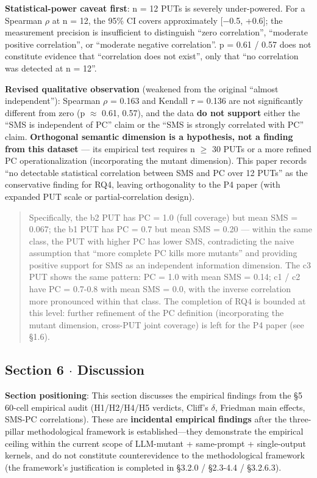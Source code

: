 \documentclass[review,12pt,authoryear]{elsarticle}
\begin{document}
\textbf{Statistical-power caveat first}: n = 12 PUTs is severely
under-powered. For a Spearman $\rho$ at n = 12, the 95\% CI covers
approximately {[}−0.5, +0.6{]}; the measurement precision is
insufficient to distinguish ``zero correlation'', ``moderate positive
correlation'', or ``moderate negative correlation''. p = 0.61 / 0.57
does not constitute evidence that ``correlation does not exist'', only
that ``no correlation was detected at n = 12''.

\textbf{Revised qualitative observation} (weakened from the original
``almost independent''): Spearman $\rho$ = 0.163 and Kendall $\tau$ = 0.136 are
not significantly different from zero (p $\approx$ 0.61, 0.57), and the data
\textbf{do not support} either the ``SMS is independent of PC'' claim or
the ``SMS is strongly correlated with PC'' claim. \textbf{Orthogonal
semantic dimension is a hypothesis, not a finding from this dataset} ---
its empirical test requires n $\geq$ 30 PUTs or a more refined PC
operationalization (incorporating the mutant dimension). This paper
records ``no detectable statistical correlation between SMS and PC over
12 PUTs'' as the conservative finding for RQ4, leaving orthogonality to
the P4 paper (with expanded PUT scale or partial-correlation design).

\begin{quote}
Specifically, the b2 PUT has PC = 1.0 (full coverage) but mean SMS =
0.067; the b1 PUT has PC = 0.7 but mean SMS = 0.20 --- within the same
class, the PUT with higher PC has lower SMS, contradicting the naive
assumption that ``more complete PC kills more mutants'' and providing
positive support for SMS as an independent information dimension. The c3
PUT shows the same pattern: PC = 1.0 with mean SMS = 0.14; c1 / c2 have
PC = 0.7-0.8 with mean SMS = 0.0, with the inverse correlation more
pronounced within that class. The completion of RQ4 is bounded at this
level: further refinement of the PC definition (incorporating the mutant
dimension, cross-PUT joint coverage) is left for the P4 paper (see
§1.6).
\end{quote}

\subsection{Section 6 $\cdot$ Discussion}\label{section-6-discussion}

\textbf{Section positioning}: This section discusses the empirical
findings from the §5 60-cell empirical audit (H1/H2/H4/H5 verdicts,
Cliff's $\delta$, Friedman main effects, SMS-PC correlations). These are
\textbf{incidental empirical findings} after the three-pillar
methodological framework is established---they demonstrate the empirical
ceiling within the current scope of LLM-mutant + same-prompt +
single-output kernels, and do not constitute counterevidence to the
methodological framework (the framework's justification is completed in
§3.2.0 / §2.3-4.4 / §3.2.6.3).
\end{document}

